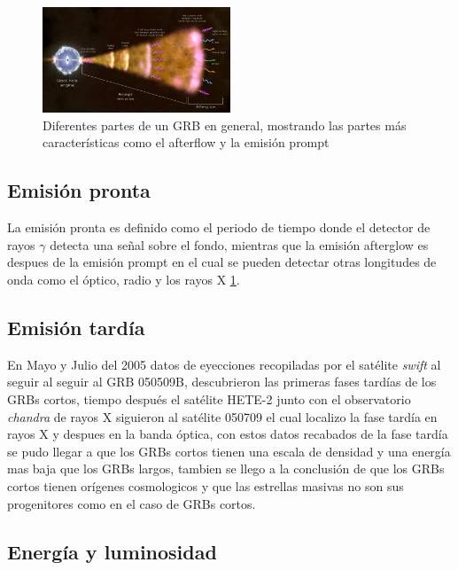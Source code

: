 \documentclass[12pt,a4paper]{book}
\begin{document}
 
 
 \begin{figure} %
  \centering
    \includegraphics[width=0.5\textwidth]{Figuras/Gamma-ray_burst_by_a_blackhole-768x432.jpg}
  \caption{Diferentes partes de un GRB en general, mostrando las partes más características como el afterflow y la emisión prompt}
  \label{fig:Partes de GRBs}
\end{figure}
 

\subsection{Emisión pronta}
La emisión pronta es definido como el periodo de tiempo donde el detector de rayos $\gamma$ detecta una señal sobre el fondo, mientras que la emisión afterglow es despues de la emisión prompt en el cual se pueden detectar otras longitudes de onda como el óptico, radio y los rayos X \ref{fig:Partes de GRBs}.
\subsection{Emisión tardía}

 En Mayo y Julio del 2005 datos de eyecciones recopiladas por el satélite \emph{swift} al seguir al seguir al GRB 050509B, descubrieron las primeras fases tardías de los GRBs cortos, tiempo después el satélite HETE-2 junto con el observatorio \emph{chandra} de rayos X siguieron al satélite 050709 el cual localizo la fase tardía en rayos X y despues en la banda óptica, con estos datos recabados de la fase tardía se pudo llegar a que los GRBs cortos tienen una escala de densidad y una energía mas baja que los GRBs largos, tambien se llego a la conclusión de que los GRBs cortos tienen orígenes cosmologicos y que las estrellas masivas no son sus progenitores como en el caso de GRBs cortos.
\subsection{Energía y luminosidad}
\end{document}
